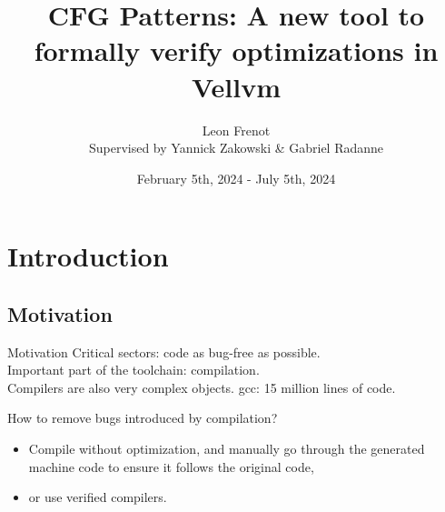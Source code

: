 \documentclass{beamer}
\title{CFG Patterns: A new tool to formally verify optimizations in Vellvm}
\author[Léon Frenot]{Leon Frenot\\ Supervised by Yannick Zakowski \& Gabriel Radanne}
\date[July 12th, 2024]{February 5th, 2024 - July 5th, 2024}
\newcommand{\leon}[1]{\textcolor{blue}{#1}}
\begin{document}
\frame{\titlepage}


\section{Introduction}


\subsection*{Motivation}

\begin{frame}{Motivation}
  Critical sectors: code as bug-free as possible.\\
  Important part of the toolchain: compilation.\\
  Compilers are also very complex objects. gcc: 15 million lines of code.
  \begin{block}{How to remove bugs introduced by compilation?}
    \begin{itemize}
      \item Compile without optimization, and manually go through the generated machine code to ensure it follows the original code,
      \item or use verified compilers.
    \end{itemize}
  \end{block}
\end{frame}
\end{document}
